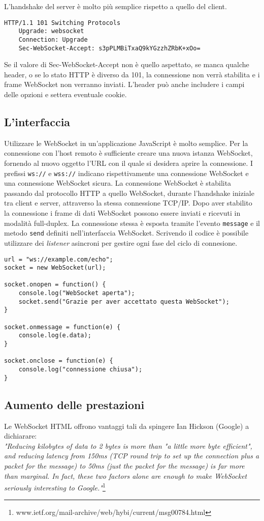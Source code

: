 L'handshake del server è molto più semplice rispetto a quello del client.

\begin{lstlisting}[caption={server handshake}, style=javaScriptCode]
	HTTP/1.1 101 Switching Protocols
	Upgrade: websocket
	Connection: Upgrade
	Sec-WebSocket-Accept: s3pPLMBiTxaQ9kYGzzhZRbK+xOo=
\end{lstlisting} 
\label{sec:serv_handshake}

Se il valore di Sec-WebSocket-Accept non è quello aspettato, se manca qualche header, o se lo stato HTTP è diverso da 101, la connessione non verrà stabilita e i frame WebSocket non verranno inviati.
L'header può anche includere i campi delle opzioni e settera eventuale cookie.
 
\subsection{L'interfaccia}
Utilizzare le WebSocket in un'applicazione JavaScript è molto semplice.
Per la connessione con l'host remoto è sufficiente creare una nuova istanza WebSocket, fornendo al nuovo oggetto l'URL con il quale si desidera aprire la connessione.
I prefissi \texttt{ws://} e \texttt{wss://} indicano rispettivamente una connessione WebSocket e una connessione WebSocket sicura.
La connessione WebSocket è stabilita passando dal protocollo HTTP a quello WebSocket, durante l'handshake iniziale tra client e server, attraverso la stessa connessione TCP/IP. Dopo aver stabilito la connessione i frame di dati WebSocket possono essere inviati e ricevuti in modalità full-duplex.
La connessione stessa è esposta tramite l'evento \texttt{message} e il metodo \texttt{send} definiti nell'interfaccia WebSocket.
Scrivendo il codice è possibile utilizzare dei \emph{listener} asincroni per gestire ogni fase del ciclo di connesione.
\begin{lstlisting}[caption={interfaccia WebSocket}, style=javaScriptCode]
url = "ws://example.com/echo";
socket = new WebSocket(url);

socket.onopen = function() {
	console.log("WebSocket aperta");
	socket.send("Grazie per aver accettato questa WebSocket");
}

socket.onmessage = function(e) {
	console.log(e.data);
}	

socket.onclose = function(e) {
	console.log("connessione chiusa");
}
\end{lstlisting} 
\label{sec:interfaccia_websocket}
\subsection{Aumento delle prestazioni}
Le WebSocket HTML offrono vantaggi tali da spingere Ian Hickson (Google) a dichiarare: \\
\textit{"Reducing kilobytes of data to 2 bytes is more than "a little more byte efficient", 
and reducing latency from 150ms (TCP round trip to set up the 
connection plus a packet for the message) to 50ms (just the packet for the 
message) is far more than marginal. 
In fact, these two factors alone are enough to make WebSocket seriously interesting to Google."}\footnote{www.ietf.org/mail-archive/web/hybi/current/msg00784.html}
  
